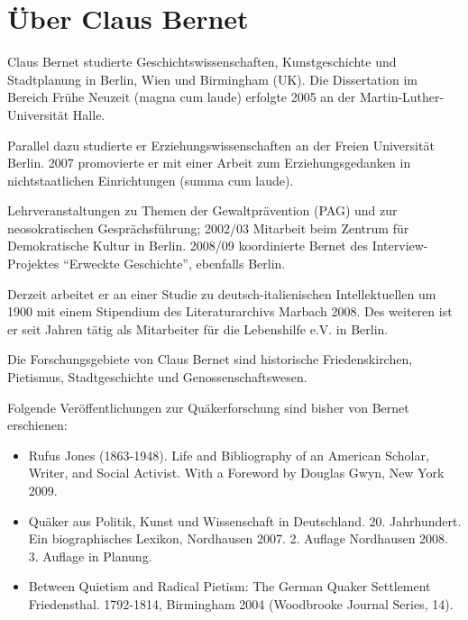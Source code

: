 \chapter{Über Claus Bernet}

Claus Bernet studierte Geschichtswissenschaften, Kunstgeschichte und
Stadtplanung in Berlin, Wien und Birmingham (UK). Die Dissertation im Bereich Frühe Neuzeit (magna cum laude)
erfolgte 2005 an der Martin-Luther-Universität Halle.

\medskip

Parallel dazu studierte er Erziehungswissenschaften an der Freien Universität Berlin.
2007 promovierte er mit einer Arbeit zum Erziehungsgedanken in nichtstaatlichen
Einrichtungen (summa cum laude).

\medskip

Lehrveranstaltungen zu Themen der Gewaltprävention (PAG) und zur neosokratischen
Gesprächsführung; 2002/03 Mitarbeit beim Zentrum für Demokratische Kultur in
Berlin. 2008/09 koordinierte Bernet des Interview-Projektes "`Erweckte
Geschichte"', ebenfalls Berlin.

\medskip

Derzeit arbeitet er an einer Studie zu deutsch-italienischen Intellektuellen um
1900 mit einem Stipendium des Literaturarchivs Marbach 2008. Des weiteren ist er
seit Jahren tätig als Mitarbeiter für die Lebenshilfe e.V. in Berlin.

\medskip

Die Forschungsgebiete von Claus Bernet sind historische Friedenskirchen,
Pietismus, Stadtgeschichte und Genossenschaftswesen.

\medskip

Folgende Veröffentlichungen zur Quäkerforschung sind bisher von Bernet
erschienen:

\begin{itemize}
 \item Rufus Jones (1863-1948). Life and Bibliography of an American Scholar,
Writer, and Social Activist. With a Foreword by Douglas Gwyn, New York 2009.
 \item Quäker aus Politik, Kunst und Wissenschaft in Deutschland. 20.
Jahrhundert. Ein biographisches Lexikon, Nordhausen 2007. 2. Auflage Nordhausen
2008. 3. Auflage in Planung.
 \item Between Quietism and Radical Pietism: The German Quaker Settlement
Friedensthal. 1792-1814, Birmingham 2004 (Woodbrooke Journal Series, 14).
\end{itemize}


